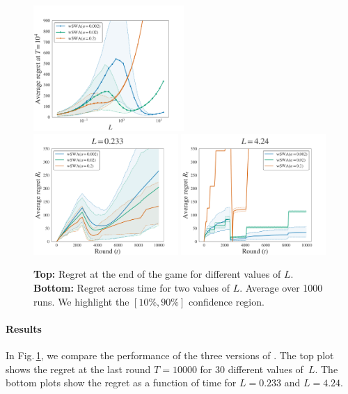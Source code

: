 \begin{figure}[t]
\centering
\includegraphics[clip, width= 0.51\textwidth]{2.1Rested/fig/fig1A_SWA.pdf}
\includegraphics[clip, width= 0.49\textwidth]{2.1Rested/fig/fig1B_SWA.pdf}
\includegraphics[clip, width= 0.49\textwidth]{2.1Rested/fig/fig1C_SWA.pdf}
\caption{\textbf{Top:} Regret at the end of the game for different values of $L$. \textbf{Bottom:} Regret across time for two values of $L$. Average over 1000 runs. We highlight the $\left[10\%, 90\%\right]$ confidence region.}
\label{fig:SWA1}
\end{figure}


\paragraph{Results} 
In Fig.\,\ref{fig:SWA1}, we compare the performance of the three versions of \wSWA. The top plot shows the regret at the last round $T = 10 000$ for 30 different values of~$L$. The bottom plots show the regret as a function of time for $L = 0.233$ and $L=4.24$.  

